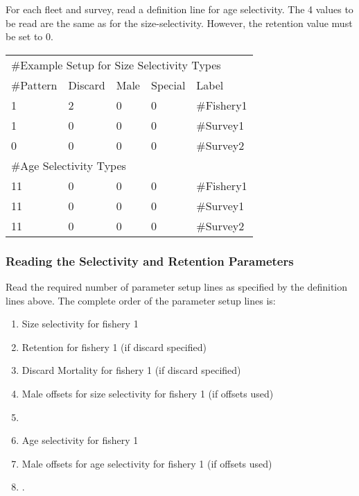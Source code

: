 For each fleet and survey, read a definition line for age selectivity.  The 4 values to be read are the same as for the size-selectivity.  However, the retention value must be set to 0.

\begin{center}
	\begin{longtable}{p{2cm} p{2cm} p{2cm} p{2cm} p{3cm} }
		\hline
		\multicolumn{5}{l}{\#Example Setup for Size Selectivity Types}\\
		\#Pattern & Discard & Male & Special & Label \\
		\hline
		1  & 2 & 0 & 0 & \#Fishery1\\
		1  & 0 & 0 & 0 & \#Survey1\\
		0  & 0 & 0 & 0 & \#Survey2\\
		\multicolumn{5}{l}{\#Age Selectivity Types}\\
		\hline
		11  & 0 & 0 & 0 & \#Fishery1\\
		11  & 0 & 0 & 0 & \#Survey1\\
		11  & 0 & 0 & 0 & \#Survey2\\
		\hline
	\end{longtable}
\end{center}

\subsubsection{Reading the Selectivity and Retention Parameters}
Read the required number of parameter setup lines as specified by the definition lines above.  The complete order of the parameter setup lines is:
\begin{enumerate}
	\item Size selectivity for fishery 1
	\item Retention for fishery 1 (if discard specified)
	\item Discard Mortality for fishery 1 (if discard specified)
	\item Male offsets for size selectivity for fishery 1 (if offsets used)
	\item <repeat for additional fleets and surveys>
	\item Age selectivity for fishery 1
	\item Male offsets for age selectivity for fishery 1 (if offsets used)
	\item <repeat for additional fleets and surveys>.
\end{enumerate}

